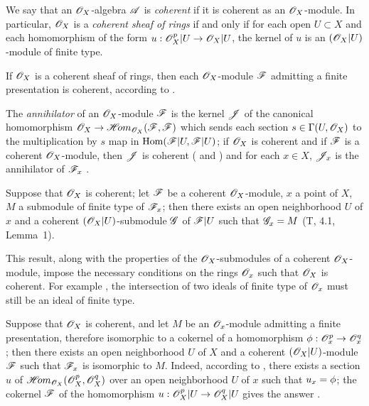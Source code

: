 \begin{env}[5.3.7]
\label{0.5.3.7}
We say that an $\mathscr{O}_X$-algebra $\mathscr{A}$ is \emph{coherent} if it is coherent as an $\mathscr{O}_X$-module.
In particular, $\mathscr{O}_X$ is a \emph{coherent sheaf of rings} if and only if for each open $U\subset X$ and each homomorphism of the form $u:\sh{O}_X^p|U\to\sh{O}_X|U$, the kernel of $u$ is an $(\mathscr{O}_X|U)$-module of finite type.

If $\mathscr{O}_X$ is a coherent sheaf of rings, then each $\mathscr{O}_X$-module $\mathscr{F}$ admitting a finite presentation  is coherent, according to .

The \emph{annihilator} of an $\mathscr{O}_X$-module $\mathscr{F}$ is the kernel $\mathscr{J}$ of the canonical homomorphism $\sh{O}_X\to\shHom_{\sh{O}_X}(\sh{F},\sh{F})$ which sends each section $s\in\Gamma(U,\mathscr{O}_X)$ to the multiplication by $s$ map in ${\mathop{\mathrm{Hom}}\nolimits}(\mathscr{F}|U,\mathscr{F}|U)$;
if $\mathscr{O}_X$ is coherent and if $\mathscr{F}$ is a coherent $\mathscr{O}_X$-module, then $\mathscr{J}$ is coherent ( and ) and for each $x\in X$, $\mathscr{J}_x$ is the annihilator of $\mathscr{F}_x$ .
\end{env}

\begin{env}[5.3.8]
\label{0.5.3.8}
Suppose that $\mathscr{O}_X$ is coherent;
let $\mathscr{F}$ be a coherent $\mathscr{O}_X$-module, $x$ a point of $X$, $M$ a submodule of finite type of $\mathscr{F}_x$;
then there exists an open neighborhood $U$ of $x$ and a coherent $(\mathscr{O}_X|U)$-submodule $\mathscr{G}$ of $\mathscr{F}|U$ such that $\mathscr{G}_x=M$ (T, 4.1, Lemma~1).

This result, along with the properties of the $\mathscr{O}_X$-submodules of a coherent $\mathscr{O}_X$-module, impose the necessary conditions on the rings $\mathscr{O}_x$ such that $\mathscr{O}_X$ is coherent.
For example , the intersection of two ideals of finite type of $\mathscr{O}_x$ must still be an ideal of finite type.
\end{env}

\begin{env}[5.3.9]
\label{0.5.3.9}
Suppose that $\mathscr{O}_X$ is coherent, and let $M$ be an $\mathscr{O}_x$-module admitting a finite presentation, therefore isomorphic to a cokernel of a homomorphism $\vphi:\sh{O}_x^p\to\sh{O}_x^q$;
then there exists an open neighborhood $U$ of $X$ and a coherent $(\mathscr{O}_X|U)$-module $\mathscr{F}$ such that $\mathscr{F}_x$ is isomorphic to $M$.
Indeed, according to , there exists a section $u$ of $\mathscr{H}\!{om}_{\mathscr{O}_X}(\mathscr{O}_X^p,\mathscr{O}_X^q)$ over an open neighborhood $U$ of $x$ such that $u_x=\phi$;
the cokernel $\mathscr{F}$ of the homomorphism $u:\sh{O}_X^p|U\to\sh{O}_X^q|U$ gives the answer .
\end{env}

